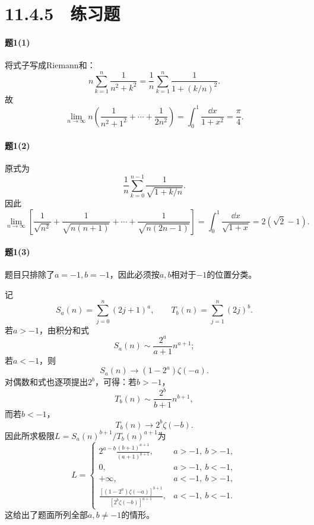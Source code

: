 \section*{11.4.5　练习题}

\paragraph{题1(1)}
\begin{xsolution}
将式子写成Riemann和：
\[
 n\sum_{k=1}^n\frac1{n^2+k^2}
 =\frac1n\sum_{k=1}^n\frac1{1+(k/n)^2}.
\]
故
\[
 \lim_{n\to\infty}n\left(\frac1{n^2+1^2}+\cdots+\frac1{2n^2}\right)
 =\int_0^1\frac{\dd x}{1+x^2}
 =\boxed{\frac\pi4}.
\]
\end{xsolution}

\paragraph{题1(2)}
\begin{xsolution}
原式为
\[
 \frac1n\sum_{k=0}^{n-1}\frac1{\sqrt{1+k/n}}.
\]
因此
\[
 \lim_{n\to\infty}\left[
\frac1{\sqrt{n^2}}+\frac1{\sqrt{n(n+1)}}+\cdots+\frac1{\sqrt{n(2n-1)}}
\right]
=\int_0^1\frac{\dd x}{\sqrt{1+x}}
=\boxed{2(\sqrt2-1)}.
\]
\end{xsolution}

\paragraph{题1(3)}
\begin{xsolution}
题目只排除了$a=-1,b=-1$，因此必须按$a,b$相对于$-1$的位置分类。

记
\[
 S_a(n)=\sum_{j=0}^n(2j+1)^a,
 \qquad
 T_b(n)=\sum_{j=1}^n(2j)^b.
\]
若$a>-1$，由积分和式
\[
 S_a(n)\sim\frac{2^a}{a+1}n^{a+1};
\]
若$a<-1$，则
\[
 S_a(n)\longrightarrow (1-2^a)\zeta(-a).
\]
对偶数和式也逐项提出$2^b$，可得：若$b>-1$，
\[
 T_b(n)\sim\frac{2^b}{b+1}n^{b+1},
\]
而若$b<-1$，
\[
 T_b(n)\longrightarrow 2^b\zeta(-b).
\]
因此所求极限$L=S_a(n)^{b+1}/T_b(n)^{a+1}$为
\[
 L=
 \begin{cases}
 \displaystyle
 2^{a-b}\frac{(b+1)^{a+1}}{(a+1)^{b+1}},&a>-1,\ b>-1,\\[8pt]
 0,&a>-1,\ b<-1,\\[4pt]
 +\infty,&a<-1,\ b>-1,\\[4pt]
 \displaystyle
 \frac{[(1-2^a)\zeta(-a)]^{b+1}}
 {[2^b\zeta(-b)]^{a+1}},&a<-1,\ b<-1.
 \end{cases}
\]
这给出了题面所列全部$a,b\ne-1$的情形。
\end{xsolution}

